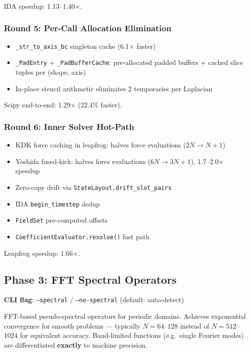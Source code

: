 IDA speedup: 1.13--1.40$\times$.

\subsubsection{Round 5: Per-Call Allocation Elimination}
\label{sec:round5}

\begin{itemize}
  \item \texttt{\_str\_to\_axis\_bc} singleton cache (6.1$\times$ faster)
  \item \texttt{\_PadEntry} + \texttt{\_PadBufferCache}: pre-allocated padded buffers + cached
    slice tuples per (shape, axis)
  \item In-place stencil arithmetic eliminates 2 temporaries per Laplacian
\end{itemize}

Scipy end-to-end: 1.29$\times$ (22.4\% faster).

\subsubsection{Round 6: Inner Solver Hot-Path}
\label{sec:round6}

\begin{itemize}
  \item KDK force caching in leapfrog: halves force evaluations ($2N \to N+1$)
  \item Yoshida fused-kick: halves force evaluations ($6N \to 3N+1$), 1.7--2.0$\times$ speedup
  \item Zero-copy drift via \texttt{StateLayout.drift\_slot\_pairs}
  \item IDA \texttt{begin\_timestep} dedup
  \item \texttt{FieldSet} pre-computed offsets
  \item \texttt{CoefficientEvaluator.resolve()} fast path
\end{itemize}

Leapfrog speedup: 1.66$\times$.

\subsection{Phase 3: FFT Spectral Operators}
\label{sec:spectral}

\textbf{CLI flag}: \texttt{--spectral} / \texttt{--no-spectral} (default: auto-detect)

FFT-based pseudo-spectral operators for periodic domains. Achieves
exponential convergence for smooth problems --- typically $N=64$--$128$ instead
of $N=512$--$1024$ for equivalent accuracy. Band-limited functions (e.g.\
single Fourier modes) are differentiated \textbf{exactly} to machine precision.

